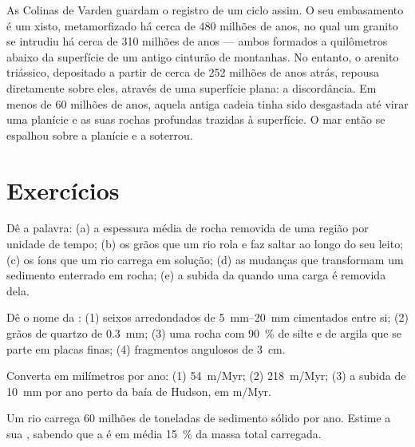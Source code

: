 As Colinas de Varden guardam o registro de um ciclo assim. O seu
embasamento é um xisto, metamorfizado há cerca de 480 milhões de anos, no
qual um granito se intrudiu há cerca de 310 milhões de anos --- ambos
formados a quilômetros abaixo da superfície de um antigo cinturão de
montanhas. No entanto, o arenito triássico, depositado a partir de cerca de
252 milhões de anos atrás, repousa diretamente sobre eles, através de uma
superfície plana: a discordância. Em menos de 60 milhões de anos, aquela
antiga cadeia tinha sido desgastada até virar uma planície e as suas rochas
profundas trazidas à superfície. O mar então se espalhou sobre a planície e
a soterrou.

\section{Exercícios}

\begin{exercise}[$\star$]\label{exo:g12:destruction-of-mountains:1}
Dê a palavra: (a) a espessura média de rocha removida de uma região por
unidade de tempo; (b) os grãos que um rio rola e faz saltar ao longo do seu
leito; (c) os íons que um rio carrega em solução; (d) as mudanças que
transformam um sedimento enterrado em rocha; (e) a subida da 
quando uma carga é removida dela.
\end{exercise}

\begin{exercise}[$\star$]\label{exo:g12:destruction-of-mountains:2}
Dê o nome da : (1) seixos arredondados de \qtyrange{5}{20}{mm}
cimentados entre si; (2) grãos de quartzo de \qty{0.3}{mm}; (3) uma rocha
com \qty{90}{\percent} de silte e de argila que se parte em placas finas;
(4) fragmentos angulosos de \qty{3}{cm}.
\end{exercise}

\begin{exercise}[$\star$]\label{exo:g12:destruction-of-mountains:3}
Converta em milímetros por ano: (1) \qty{54}{m/Myr}; (2) \qty{218}{m/Myr};
(3) a subida de \qty{10}{mm} por ano perto da baía de Hudson, em \unit{m/Myr}.
\end{exercise}

\begin{exercise}[$\star$]\label{exo:g12:destruction-of-mountains:4}
Um rio carrega 60 milhões de toneladas de sedimento sólido por ano. Estime
a sua , sabendo que a  é em média
\qty{15}{\percent} da massa total carregada.
\end{exercise}

